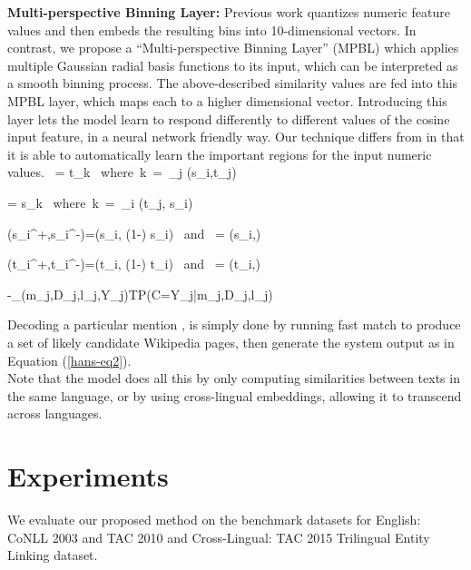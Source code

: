 \documentclass[letterpaper]{article} \usepackage{aaai18}  \usepackage{times}  \usepackage{helvet}  \usepackage{courier}  \usepackage{url}  \usepackage{graphicx}  \frenchspacing  \setlength{\pdfpagewidth}{8.5in}  \setlength{\pdfpageheight}{11in}  \usepackage{latexsym}
\DeclareMathOperator{\cosine}{cos}
\newcommand{\cti}{s}
\newcommand{\wpfi}{t}
\begin{document}
\textbf{Multi-perspective Binning Layer:} Previous work \cite{liu2016neural} quantizes numeric feature values and then embeds the resulting bins into 10-dimensional vectors. In contrast, we propose a ``Multi-perspective Binning Layer'' (MPBL) which applies multiple Gaussian radial basis functions to its input, which can be interpreted as a smooth binning process. The above-described similarity values are fed into this MPBL layer, which maps each to a higher dimensional vector. Introducing this layer lets the model learn to respond differently to different values of the cosine input feature, in a neural network friendly way. Our technique differs from \cite{liu2016neural} in that it is able to automatically learn the important regions for the input numeric values.\
\hat{\cti{}_i} = \wpfi{}_k \mbox{ where k = }\argmax_j \cosine(\cti{}_i,\wpfi{}_j) 

\hat{\wpfi{}_j} = \cti{}_k \mbox{ where k = }\argmax_i \cosine(\wpfi{}_j, \cti{}_i)

(\cti{}_i^{+},\cti{}_i^{-})=(\alpha \cti{}_i, (1-\alpha) \cti{}_i) \mbox{ and } \alpha = \cosine(\cti{}_i,\hat{\cti{}_i})

(\wpfi{}_i^{+},\wpfi{}_i^{-})=(\alpha \wpfi{}_i, (1-\alpha) \wpfi{}_i) \mbox{ and } \alpha = \cosine(\wpfi{}_i,\hat{\wpfi{}_i})

-\sum_{(m_j,D_j,l_j,Y_j)\in T}\log P(C=Y_j|m_j,D_j,l_j)


Decoding a particular mention , is simply done by running fast match  to produce a set of likely candidate Wikipedia pages, then generate the system output  as in Equation (\ref{hans-eq2}).\\
Note that the model does all this by only computing similarities between texts in the same language, or by using cross-lingual embeddings, allowing it to transcend across languages. \section{Experiments}
\label{sec:experiments}
We evaluate our proposed method on the benchmark datasets for English: CoNLL 2003 and TAC 2010 and Cross-Lingual: TAC 2015 Trilingual Entity Linking dataset.
\end{document}
